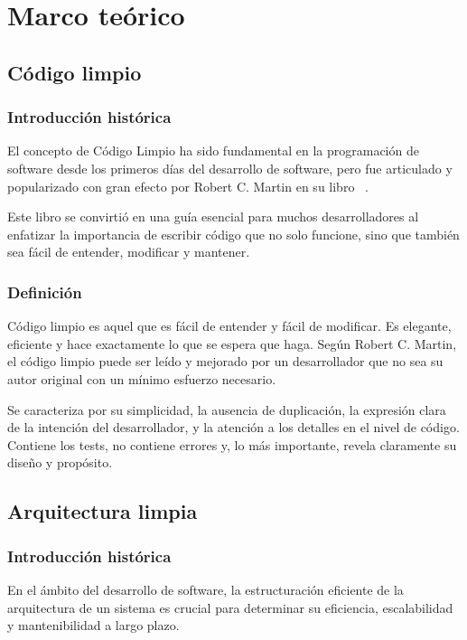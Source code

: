 \chapter{Marco teórico}\label{ch:chapter_2}



\section{Código limpio}

\subsection{Introducción histórica}
El concepto de Código Limpio ha sido fundamental en la programación de software desde los primeros días del desarrollo
de software, pero fue articulado y popularizado con gran efecto por Robert C. Martin en su libro ~\cite{martin2008}.


Este libro se convirtió en una guía esencial para muchos desarrolladores al enfatizar la importancia de escribir código
que no solo funcione, sino que también sea fácil de entender, modificar y mantener.

\subsection{Definición}
Código limpio es aquel que es fácil de entender y fácil de modificar.
Es elegante, eficiente y hace exactamente lo que se espera que haga.
Según Robert C. Martin, el código limpio puede ser leído y mejorado por un
desarrollador que no sea su autor original con un mínimo esfuerzo necesario.

Se caracteriza por su simplicidad, la ausencia de duplicación, la expresión clara de la intención del desarrollador, y
la atención a los detalles en el nivel de código.
Contiene los tests, no contiene errores y, lo más importante, revela claramente su diseño y propósito.


\section{Arquitectura limpia}

\subsection{Introducción histórica}
En el ámbito del desarrollo de software, la estructuración eficiente de la arquitectura de un sistema
es crucial para determinar su eficiencia, escalabilidad y mantenibilidad a largo plazo.

